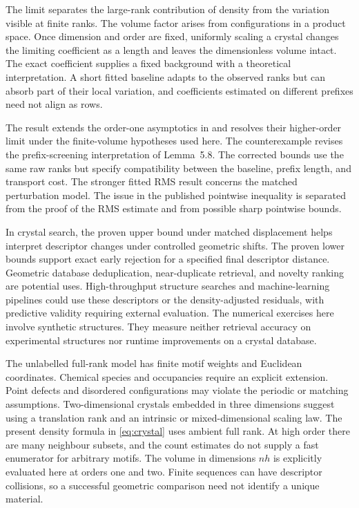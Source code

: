 \documentclass[11pt,a4paper]{article}
\theoremstyle{definition}
\begin{document}
The limit separates the large-rank contribution of density from the variation visible at finite ranks. The volume factor arises from configurations in a product space. Once dimension and order are fixed, uniformly scaling a crystal changes the limiting coefficient as a length and leaves the dimensionless volume intact. The exact coefficient supplies a fixed background with a theoretical interpretation. A short fitted baseline adapts to the observed ranks but can absorb part of their local variation, and coefficients estimated on different prefixes need not align as rows.

The result extends the order-one asymptotics in \cite{wkhigher} and resolves their higher-order limit under the finite-volume hypotheses used here. The counterexample revises the prefix-screening interpretation of Lemma~5.8. The corrected bounds use the same raw ranks but specify compatibility between the baseline, prefix length, and transport cost. The stronger fitted RMS result concerns the matched perturbation model. The issue in the published pointwise inequality is separated from the proof of the RMS estimate and from possible sharp pointwise bounds.

In crystal search, the proven upper bound under matched displacement helps interpret descriptor changes under controlled geometric shifts. The proven lower bounds support exact early rejection for a specified final descriptor distance. Geometric database deduplication, near-duplicate retrieval, and novelty ranking are potential uses. High-throughput structure searches and machine-learning pipelines could use these descriptors or the density-adjusted residuals, with predictive validity requiring external evaluation. The numerical exercises here involve synthetic structures. They measure neither retrieval accuracy on experimental structures nor runtime improvements on a crystal database.

The unlabelled full-rank model has finite motif weights and Euclidean coordinates. Chemical species and occupancies require an explicit extension. Point defects and disordered configurations may violate the periodic or matching assumptions. Two-dimensional crystals embedded in three dimensions suggest using a translation rank and an intrinsic or mixed-dimensional scaling law. The present density formula in \eqref{eq:crystal} uses ambient full rank. At high order there are many neighbour subsets, and the count estimates do not supply a fast enumerator for arbitrary motifs. The volume in dimensions \(nh\) is explicitly evaluated here at orders one and two. Finite sequences can have descriptor collisions, so a successful geometric comparison need not identify a unique material.
\end{document}
